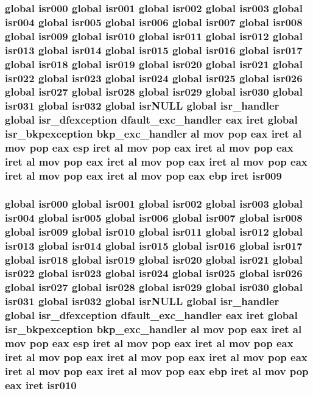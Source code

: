 \subsubsection[{\texorpdfstring{isr009}{isr009}}]{\setlength{\rightskip}{0pt plus 5cm}global {\bf isr000} global {\bf isr001} global {\bf isr002} global {\bf isr003} global {\bf isr004} global {\bf isr005} global {\bf isr006} global {\bf isr007} global {\bf isr008} global isr009 global {\bf isr010} global {\bf isr011} global {\bf isr012} global {\bf isr013} global {\bf isr014} global {\bf isr015} global {\bf isr016} global {\bf isr017} global {\bf isr018} global {\bf isr019} global {\bf isr020} global {\bf isr021} global {\bf isr022} global {\bf isr023} global {\bf isr024} global {\bf isr025} global {\bf isr026} global {\bf isr027} global {\bf isr028} global {\bf isr029} global {\bf isr030} global {\bf isr031} global isr032 global isr\+N\+U\+LL global isr\+\_\+handler global {\bf isr\+\_\+dfexception} {\bf dfault\+\_\+exc\+\_\+handler} eax iret global {\bf isr\+\_\+bkpexception} {\bf bkp\+\_\+exc\+\_\+handler} {\bf al} {\bf mov} pop eax iret {\bf al} {\bf mov} pop eax esp iret {\bf al} {\bf mov} pop eax iret {\bf al} {\bf mov} pop eax iret {\bf al} {\bf mov} pop eax iret {\bf al} {\bf mov} pop eax iret {\bf al} {\bf mov} pop eax iret {\bf al} {\bf mov} pop eax iret {\bf al} {\bf mov} pop eax ebp iret isr009}\hypertarget{isrs_8as_a3e1fe907c205808f20a713fa2c479fdb}{}\label{isrs_8as_a3e1fe907c205808f20a713fa2c479fdb}
\subsubsection[{\texorpdfstring{isr010}{isr010}}]{\setlength{\rightskip}{0pt plus 5cm}global {\bf isr000} global {\bf isr001} global {\bf isr002} global {\bf isr003} global {\bf isr004} global {\bf isr005} global {\bf isr006} global {\bf isr007} global {\bf isr008} global {\bf isr009} global isr010 global {\bf isr011} global {\bf isr012} global {\bf isr013} global {\bf isr014} global {\bf isr015} global {\bf isr016} global {\bf isr017} global {\bf isr018} global {\bf isr019} global {\bf isr020} global {\bf isr021} global {\bf isr022} global {\bf isr023} global {\bf isr024} global {\bf isr025} global {\bf isr026} global {\bf isr027} global {\bf isr028} global {\bf isr029} global {\bf isr030} global {\bf isr031} global isr032 global isr\+N\+U\+LL global isr\+\_\+handler global {\bf isr\+\_\+dfexception} {\bf dfault\+\_\+exc\+\_\+handler} eax iret global {\bf isr\+\_\+bkpexception} {\bf bkp\+\_\+exc\+\_\+handler} {\bf al} {\bf mov} pop eax iret {\bf al} {\bf mov} pop eax esp iret {\bf al} {\bf mov} pop eax iret {\bf al} {\bf mov} pop eax iret {\bf al} {\bf mov} pop eax iret {\bf al} {\bf mov} pop eax iret {\bf al} {\bf mov} pop eax iret {\bf al} {\bf mov} pop eax iret {\bf al} {\bf mov} pop eax ebp iret {\bf al} {\bf mov} pop eax iret isr010}\hypertarget{isrs_8as_a473b761b23ec3a5d61cac86a23bc8502}{}\label{isrs_8as_a473b761b23ec3a5d61cac86a23bc8502}
